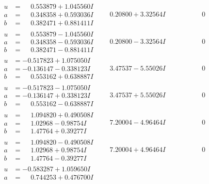 \documentclass[1p]{elsarticle_modified}
\theoremstyle{definition}
\begin{document}
$$\begin{array}{c|c|c}
\begin{aligned}
u &= \phantom{-}0.553879 + 1.045560 I \\
a &= \phantom{-}0.348358 + 0.593036 I \\
b &= \phantom{-}0.382471 + 0.881411 I\end{aligned}
 & \phantom{-}0.20800 + 3.32564 I & \phantom{-0.000000 } 0 \\ \hline\begin{aligned}
u &= \phantom{-}0.553879 - 1.045560 I \\
a &= \phantom{-}0.348358 - 0.593036 I \\
b &= \phantom{-}0.382471 - 0.881411 I\end{aligned}
 & \phantom{-}0.20800 - 3.32564 I & \phantom{-0.000000 } 0 \\ \hline\begin{aligned}
u &= -0.517823 + 1.075050 I \\
a &= -0.136147 - 0.338123 I \\
b &= \phantom{-}0.553162 + 0.638887 I\end{aligned}
 & \phantom{-}3.47537 - 5.55026 I & \phantom{-0.000000 } 0 \\ \hline\begin{aligned}
u &= -0.517823 - 1.075050 I \\
a &= -0.136147 + 0.338123 I \\
b &= \phantom{-}0.553162 - 0.638887 I\end{aligned}
 & \phantom{-}3.47537 + 5.55026 I & \phantom{-0.000000 } 0 \\ \hline\begin{aligned}
u &= \phantom{-}1.094820 + 0.490508 I \\
a &= \phantom{-}1.02968 - 0.98754 I \\
b &= \phantom{-}1.47764 + 0.39277 I\end{aligned}
 & \phantom{-}7.20004 - 4.96464 I & \phantom{-0.000000 } 0 \\ \hline\begin{aligned}
u &= \phantom{-}1.094820 - 0.490508 I \\
a &= \phantom{-}1.02968 + 0.98754 I \\
b &= \phantom{-}1.47764 - 0.39277 I\end{aligned}
 & \phantom{-}7.20004 + 4.96464 I & \phantom{-0.000000 } 0 \\ \hline\begin{aligned}
u &= -0.583287 + 1.059650 I \\
a &= \phantom{-}0.744253 + 0.476700 I \\

\end{aligned}
\end{array}$$
\end{document}
